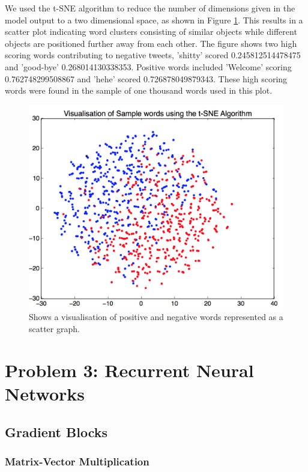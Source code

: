 \documentclass{article} %
\begin{document}
We used the t-SNE algorithm\cite{van2008visualizing} to reduce the number of dimensions given in the model output to a two dimensional space, as shown in Figure \ref{fig:tsne}. This results in a scatter plot indicating word clusters consisting of similar objects while different objects are positioned further away from each other. The figure shows two high scoring words contributing to negative tweets, 'shitty' scored 0.245812514478475 and 'good-bye' 0.268014130338353. Positive words included 'Welcome' scoring 0.762748299508867 and 'hehe' scored 0.726878049879343. These high scoring words were found in the sample of one thousand words used in this plot.

\begin{figure}[!htbp]
\centering
\includegraphics[scale=0.75]{tsne}
\caption{Shows a visualisation of positive and negative words represented as a scatter graph.}
\label{fig:tsne}
\end{figure}

\section{Problem 3: Recurrent Neural Networks}

\subsection{Gradient Blocks}

\subsubsection*{Matrix-Vector Multiplication}
\end{document}
